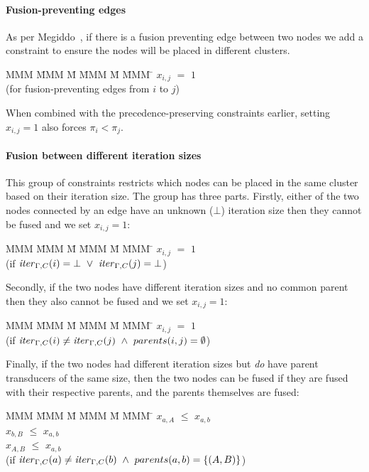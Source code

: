 \paragraph{Fusion-preventing edges} As per Megiddo~\cite{megiddo1998optimal}, if there is a fusion preventing edge between two nodes we add a constraint to ensure the nodes will be placed in different clusters.
\begin{tabbing}
MMM     \= MMM \= M  \= MMM \= M \= MMM \= \kill
        \> $x_{i,j}$ \> $=$ \> $1$ \>   \> \\
        \> (for fusion-preventing edges from $i$ to $j$) 
\end{tabbing}

When combined with the precedence-preserving constraints earlier, setting $x_{i,j} = 1$ also forces $\pi_i < \pi_j$. 


\paragraph{Fusion between different iteration sizes} This group of constraints restricts which nodes can be placed in the same cluster based on their iteration size. The group has three parts. 
Firstly, either of the two nodes connected by an edge have an unknown ($\bot$) iteration size then they cannot be fused and we set $x_{i,j} = 1$:
\begin{tabbing}
MMM     \= MMM \= M \= MMM \= M \= MMM \= \kill
        \> $x_{i,j}$   \> $=$   \> $1$          \>       \>     \\
        \> (if $\mathit{iter}_{\Gamma,C}(i) = \bot 
                ~\vee~ \mathit{iter}_{\Gamma,C}(j) = \bot$)
\end{tabbing}

Secondly, if the two nodes have different iteration sizes and no common parent then they also cannot be fused and we set $x_{i,j} = 1$:
\begin{tabbing}
MMM     \= MMM \= M \= MMM \= M \= MMM \= \kill
        \> $x_{i,j}$   \> $=$   \> $1$          \>       \>     \\
        \> (if $\mathit{iter}_{\Gamma,C}(i) \not= \mathit{iter}_{\Gamma,C}(j) 
                ~\wedge~ parents(i,j) = \emptyset$)
\end{tabbing}

Finally, if the two nodes had different iteration sizes but \emph{do} have parent transducers of the same size, then the two nodes can be fused if they are fused with their respective parents, and the parents themselves are fused:
\begin{tabbing}
MMM     \= MMM \= M \= MMM \= M \= MMM \= \kill
        \> $x_{a,A}$   \> $\le$ \> $x_{a,b}$    \>       \>     \\
        \> $x_{b,B}$   \> $\le$ \> $x_{a,b}$    \>       \>     \\
        \> $x_{A,B}$   \> $\le$ \> $x_{a,b}$    \>       \>     \\
        \> (if $\mathit{iter}_{\Gamma,C}(a) \not= \mathit{iter}_{\Gamma,C}(b) 
                ~\wedge~ parents(a,b) = \{(A,B)\}$)
\end{tabbing}

